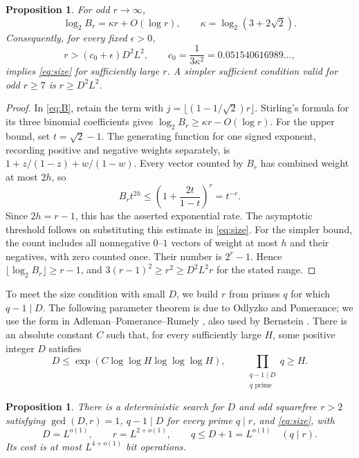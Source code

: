\documentclass[11pt]{article}
\newtheorem{proposition}[theorem]{Proposition}
\theoremstyle{definition}
\theoremstyle{remark}
\begin{document}
\begin{proposition}\label{prop:count}
For odd $r\to\infty$,
\[
 \log_2 B_r=\kappa r+O(\log r),\qquad
 \kappa=\log_2(3+2\sqrt2).
\]
Consequently, for every fixed $\epsilon>0$,
\[
 r>(c_0+\epsilon)D^2L^2,\qquad
 c_0=\frac1{3\kappa^2}=0.051540616989\ldots,
\]
implies \eqref{eq:size} for sufficiently large $r$.
A simpler sufficient condition valid for odd $r\ge7$ is
$r\ge D^2L^2$.
\end{proposition}

\begin{proof}
In \eqref{eq:B}, retain the term with
$j=\lfloor(1-1/\sqrt2)r\rfloor$. Stirling's formula for its three
binomial coefficients gives $\log_2 B_r\ge\kappa r-O(\log r)$.
For the upper bound, set $t=\sqrt2-1$. The generating function for
one signed exponent, recording positive and negative weights
separately, is $1+z/(1-z)+w/(1-w)$. Every vector counted by $B_r$
has combined weight at most $2h$, so
\[
 B_r t^{2h}\le
 \left(1+\frac{2t}{1-t}\right)^r=t^{-r}.
\]
Since $2h=r-1$, this has the asserted exponential rate. The
asymptotic threshold follows on substituting this estimate in
\eqref{eq:size}. For the simpler bound, the count includes all
nonnegative $0$--$1$ vectors of weight at most $h$ and their
negatives, with zero counted once. Their number is $2^r-1$.
Hence $\lfloor\log_2 B_r\rfloor\ge r-1$, and
$3(r-1)^2\ge r^2\ge D^2L^2r$ for the stated range.
\end{proof}

To meet the size condition with small $D$, we build $r$ from primes
$q$ for which $q-1\mid D$. The following parameter theorem is due
to Odlyzko and Pomerance;
we use the form in Adleman--Pomerance--Rumely
\cite[Theorem 3]{apr}, also used by Bernstein \cite{bernstein}.
There is an absolute constant $C$ such that, for every sufficiently
large $H$, some positive integer $D$ satisfies
\begin{equation}\label{eq:OP}
 D\le\exp(C\log\log H\log\log\log H),\qquad
 \prod_{\substack{q-1\mid D\\q\text{ prime}}}q\ge H.
\end{equation}

\begin{proposition}\label{prop:degrees}
There is a deterministic search for $D$ and odd squarefree $r>2$
satisfying $\gcd(D,r)=1$, $q-1\mid D$ for every prime $q\mid r$,
and \eqref{eq:size}, with
\begin{equation}\label{eq:parameter-sizes}
 D=L^{o(1)},\qquad r=L^{2+o(1)},\qquad
 q\le D+1=L^{o(1)}\quad(q\mid r).
\end{equation}
Its cost is at most $L^{4+o(1)}$ bit operations.
\end{proposition}
\end{document}
